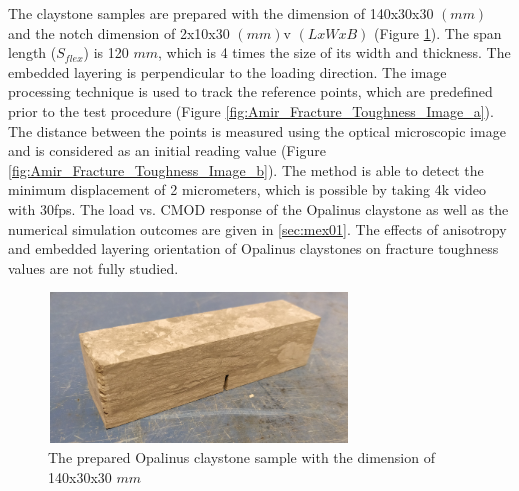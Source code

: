 The claystone samples are prepared with the dimension of 140x30x30 $(mm)$ and the notch dimension of 2x10x30 $(mm)$v $(LxWxB)$  (Figure \ref{fig:Amir_Fracture_Toughness_Sample}). The span length ($S_{flex}$) is 120 $mm$, which is 4 times the size of its width and thickness. The embedded layering is perpendicular to the loading direction. The image processing technique is used to track the reference points, which are predefined prior to the test procedure (Figure \ref{fig:Amir_Fracture_Toughness_Image_a}). The distance between the points is measured using the optical microscopic image and is considered as an initial reading value (Figure \ref{fig:Amir_Fracture_Toughness_Image_b}). The method is able to detect the minimum displacement of 2 micrometers, which is possible by taking 4k video with 30fps. The load vs. CMOD response of the Opalinus claystone as well as the numerical simulation outcomes are given in \ref{sec:mex01}. The effects of anisotropy and embedded layering orientation of Opalinus claystones on fracture toughness values are not fully studied. 

\begin{figure}[!ht]
\centering
\includegraphics[width=8cm,height=4cm]{figures/Amir_Fracture_Toughness_Sample.png}
\caption{The prepared Opalinus claystone sample with the dimension of 140x30x30 $mm$}
\label{fig:Amir_Fracture_Toughness_Sample}
\end{figure} 

